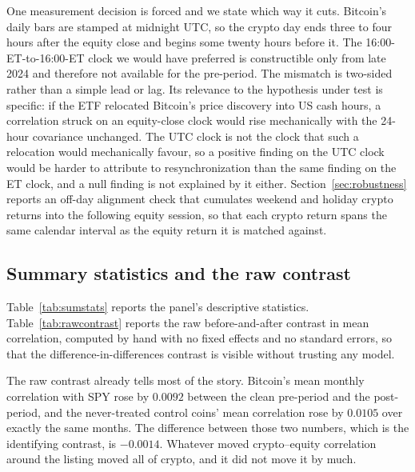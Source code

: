 \documentclass[12pt,a4paper]{article}
\begin{document}
One measurement decision is forced and we state which way it cuts. Bitcoin's daily bars are stamped at midnight UTC, so the crypto day ends three to four hours after the equity close and begins some twenty hours before it. The 16:00-ET-to-16:00-ET clock we would have preferred is constructible only from late 2024 and therefore not available for the pre-period. The mismatch is two-sided rather than a simple lead or lag. Its relevance to the hypothesis under test is specific: if the ETF relocated Bitcoin's price discovery into US cash hours, a correlation struck on an equity-close clock would rise mechanically with the 24-hour covariance unchanged. The UTC clock is not the clock that such a relocation would mechanically favour, so a positive finding on the UTC clock would be harder to attribute to resynchronization than the same finding on the ET clock, and a null finding is not explained by it either. Section~\ref{sec:robustness} reports an off-day alignment check that cumulates weekend and holiday crypto returns into the following equity session, so that each crypto return spans the same calendar interval as the equity return it is matched against.

\subsection{Summary statistics and the raw contrast}

Table~\ref{tab:sumstats} reports the panel's descriptive statistics. Table~\ref{tab:rawcontrast} reports the raw before-and-after contrast in mean correlation, computed by hand with no fixed effects and no standard errors, so that the difference-in-differences contrast is visible without trusting any model.





The raw contrast already tells most of the story. Bitcoin's mean monthly correlation with SPY rose by
$0.0092$ between the clean pre-period and the post-period, and the never-treated control coins' mean correlation rose by
$0.0105$ over exactly the same months. The difference between those two numbers, which is the identifying contrast, is
$-0.0014$. Whatever moved crypto--equity correlation around the listing moved all of crypto, and it did not move it by much.
\end{document}
